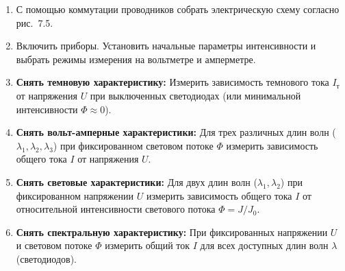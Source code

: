 \newpage
{}
\begin{enumerate}
    \item С помощью коммутации проводников собрать электрическую схему согласно рис.~7.5.
    
    \item Включить приборы. Установить начальные параметры интенсивности и выбрать режимы измерения на вольтметре и амперметре.
    
    \item \textbf{Снять темновую характеристику:} Измерить зависимость темнового тока $I_\text{т}$ от напряжения $U$ при выключенных светодиодах (или минимальной интенсивности $\Phi \approx 0$).
    
    \item \textbf{Снять вольт-амперные характеристики:} Для трех различных длин волн ($\lambda_1, \lambda_2, \lambda_3$) при фиксированном световом потоке $\Phi$ измерить зависимость общего тока $I$ от напряжения $U$.
    
    \item \textbf{Снять световые характеристики:} Для двух длин волн ($\lambda_1, \lambda_2$) при фиксированном напряжении $U$ измерить зависимость общего тока $I$ от относительной интенсивности светового потока $\Phi = J/J_0$.
    
    \item \textbf{Снять спектральную характеристику:} При фиксированных напряжении $U$ и световом потоке $\Phi$ измерить общий ток $I$ для всех доступных длин волн $\lambda$ (светодиодов).
\end{enumerate}







































\newpage
\thispagestyle{empty}

